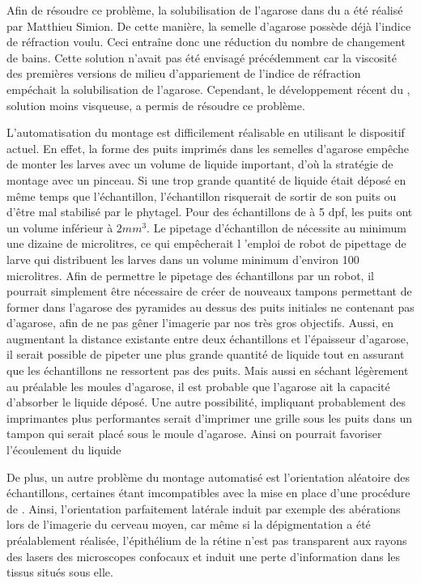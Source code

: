 \documentclass[\main/main.tex]{subfiles}
\begin{document}
%
Afin de résoudre ce problème, la solubilisation de l'agarose dans du \MD{} a été réalisé par Matthieu Simion.
%
De cette manière, la semelle d'agarose possède déjà l'indice de réfraction voulu.
%
Ceci entraîne donc une réduction du nombre de changement de bains.
Cette solution n'avait pas été envisagé précédemment car la viscosité des premières versions de milieu d'appariement de l'indice de réfraction empéchait la solubilisation de l'agarose.
%
Cependant, le développement récent du \MD{}, solution moins visqueuse, a permis de résoudre ce problème.

L'automatisation du montage est difficilement réalisable en utilisant le dispositif actuel.
%
En effet,
la forme des puits imprimés dans les semelles d'agarose empêche de monter les larves avec un volume de liquide important, d'où la stratégie de montage avec un pinceau.
%
Si une trop grande quantité de liquide était déposé en même temps que l'échantillon,
l'échantillon risquerait de sortir de son puits ou d'être mal stabilisé par le phytagel.
%
Pour des échantillons de \pz{} à 5 dpf, les puits ont un volume inférieur à $2 mm^{3}$. 
%
Le pipetage d'échantillon de \pz{} nécessite au minimum une dizaine de microlitres, ce qui empêcherait l 'emploi de robot de pipettage de larve qui distribuent les larves dans un volume minimum d'environ 100 microlitres.
%
Afin de permettre le pipetage des échantillons par un robot, il pourrait simplement être nécessaire de créer de nouveaux tampons permettant de former dans l'agarose des pyramides au dessus des puits initiales ne contenant pas d'agarose, afin de ne pas gêner l'imagerie par nos très gros objectifs.
%
Aussi, en augmentant la distance existante entre deux échantillons et l'épaisseur d'agarose,
il serait possible de pipeter une plus grande quantité de liquide tout en assurant que les échantillons ne ressortent pas des puits. Mais aussi en séchant légèrement au préalable les moules d'agarose, il est probable que l'agarose ait la capacité d'absorber le liquide déposé. Une autre possibilité, impliquant probablement des imprimantes plus performantes serait d'imprimer une grille sous les puits dans un tampon qui serait placé sous le moule d'agarose. Ainsi on pourrait favoriser l'écoulement du liquide

%
%
De plus, un autre problème du montage automatisé est l'orientation aléatoire des échantillons, certaines étant imcompatibles avec la mise en place d'une procédure de \hcs{}.
%
Ainsi, l'orientation parfaitement latérale induit par exemple des abérations lors de l'imagerie du cerveau moyen, car même si la dépigmentation a été préalablement réalisée, l'épithélium de la rétine n'est pas transparent aux rayons des lasers des microscopes confocaux et induit une perte d'information dans les tissus situés sous elle.
\end{document}
